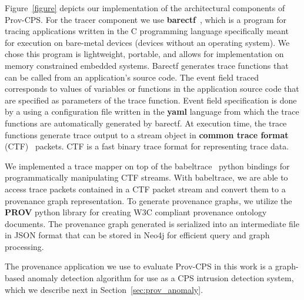 Figure~\ref{figure} depicts our implementation of the architectural components of Prov-CPS. For the tracer component we use \textbf{barectf}~\cite{barectf}, which is a program for tracing applications written in the C programming language specifically meant for execution on bare-metal devices (devices without an operating system). We chose this program is lightweight, portable, and allows for implementation on memory constrained embedded systems.
%
%
Barectf generates trace functions that can be called from an application's source code. The event field traced corresponds to values of variables or functions in the application source code that are specified as parameters of the trace function. 
%
%
%
%
Event field specification is done by a using a configuration file written in the \textbf{yaml} language from which the trace functions are automatically generated by barectf. At execution time, the trace functions generate trace output to a stream object in \textbf{common trace format} (CTF)~\cite{ctf} packets. CTF is a fast binary trace format for representing trace data.

We implemented a trace mapper on top of the babeltrace~\cite{babeltrace} python bindings for programmatically manipulating CTF streams. With babeltrace, we are able to access trace packets contained in a CTF packet stream and convert them to a provenance graph representation. To generate provenance graphs, we utilize the \textbf{PROV} python library for creating W3C compliant provenance ontology documents. The provenance graph generated is serialized into an intermediate file in JSON format that can be stored in Neo4j for efficient query and graph processing.

The provenance application we use to evaluate Prov-CPS in this work is a graph-based anomaly detection algorithm for use as a CPS intrusion detection system, which we describe next in Section~\ref{sec:prov_anomaly}.







 
